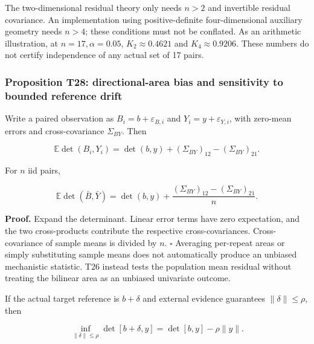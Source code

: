 \documentclass[11pt,a4paper]{article}
\begin{document}
The two-dimensional residual theory only needs \(n>2\) and invertible
residual covariance. An implementation using positive-definite
four-dimensional auxiliary geometry needs \(n>4\); these conditions must
not be conflated. As an arithmetic illustration, at
\(n=17,\alpha=0.05\), \(K_2\approx0.4621\) and \(K_4\approx0.9206\).
These numbers do not certify independence of any actual set of 17 pairs.

\subsubsection{Proposition T28: directional-area bias and sensitivity to
bounded reference
drift}\label{proposition-t28-directional-area-bias-and-sensitivity-to-bounded-reference-drift}

\par
\noindent\begin{minipage}{\linewidth}

Write a paired observation as \(B_i=b+\varepsilon_{B,i}\) and
\(Y_i=y+\varepsilon_{Y,i}\), with zero-mean errors and cross-covariance
\(\Sigma_{BY}\). Then

\[
\mathbb E\det(B_i,Y_i)
=\det(b,y)+(\Sigma_{BY})_{12}-(\Sigma_{BY})_{21}.
\]

\end{minipage}\par

\par
\noindent\begin{minipage}{\linewidth}

For \(n\) iid pairs,

\[
\mathbb E\det(\bar B,\bar Y)
=\det(b,y)+
\frac{(\Sigma_{BY})_{12}-(\Sigma_{BY})_{21}}n.
\]

\end{minipage}\par

\textbf{Proof.} Expand the determinant. Linear error terms have zero
expectation, and the two cross-products contribute the respective
cross-covariances. Cross-covariance of sample means is divided by \(n\).
\(\square\) Averaging per-repeat areas or simply substituting sample
means does not automatically produce an unbiased mechanistic statistic.
T26 instead tests the population mean residual without treating the
bilinear area as an unbiased univariate outcome.

\par
\noindent\begin{minipage}{\linewidth}

If the actual target reference is \(b+\delta\) and external evidence
guarantees \(\|\delta\|\le\rho\), then

\[
\inf_{\|\delta\|\le\rho}\det[b+\delta,y]
=\det[b,y]-\rho\|y\|.
\]

\end{minipage}\par
\end{document}
